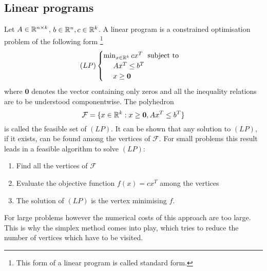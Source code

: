 \subsection{Linear programs}

    Let $A\in\mathbb{R}^{n\times k}$, $b\in\mathbb{R}^{n}, c\in\mathbb{R}^{k}$. A linear program is a constrained optimisation problem of the following form
    \footnote{This form of a linear program is called standard form. }
    \begin{align*}
        (LP)
        \begin{cases}
            \min_{x\in\mathbb{R}^{k}}cx^{T} ~\text{ subject to}\\
            ~~~~ Ax^{T}\leq b^{T}\\
            ~~~~ x\geq \mathbf{0}
        \end{cases}
    \end{align*}
    where $\mathbf{0}$ denotes the vector containing only zeros and all the inequality relations are to be understood componentwise. The polyhedron
    \begin{equation*}
        \mathcal{F} = \{x\in\mathbb{R}^{k} : x\geq\mathbf{0}, Ax^{T}\leq b^{T}\}
    \end{equation*}
    is called the feasible set of $(LP)$. It can be shown that any solution to $(LP)$, if it exists, can be found among the vertices of $\mathcal{F}$. For small
    problems this result leads in a feasible algorithm to solve $(LP)$:
    \begin{enumerate}
        \item Find all the vertices of $\mathcal{F}$
        \item Evaluate the objective function $f(x) = cx^{T}$ among the vertices
        \item The solution of $(LP)$ is the vertex minimising $f$.
    \end{enumerate}
    For large problems however the numerical costs of this approach are too large. This is 
    why the simplex method comes into play, which tries to reduce the number of vertices which have to be visited.

